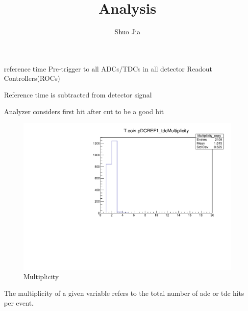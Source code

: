 \documentclass[10pt]{beamer}
\title{Analysis}
\date{}
\author{Shuo Jia}
\begin{document}
\maketitle



\begin{frame}[fragile]{reference time}
Pre-trigger to all ADCs/TDCs in all detector Readout Controllers(ROCs)

Reference time is subtracted from detector signal

Analyzer considers first hit after cut to be a good hit

  
\end{frame}

\begin{frame}{}

\begin{minipage}{0.5\textwidth}
\begin{figure}[H]
\includegraphics[width = \textwidth]{multiplicity.pdf}
\caption{\label{multiplicity} Multiplicity}
\end{figure}
\end{minipage} \hfill
\begin{minipage}{0.45\textwidth}
The multiplicity of a given variable refers to the total number of adc or tdc hits per event. 
\end{minipage}
   

\end{frame}{}
\end{document}
